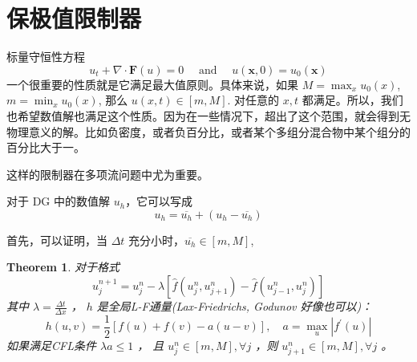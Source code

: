 \documentclass{article}
\newtheorem{theorem}{Theorem}
\numberwithin{equation}{subsection}    %
\begin{document}
\section{保极值限制器}
\cite{RN6}
标量守恒性方程
\begin{equation}
    u_{t}+\nabla \cdot \mathbf{F}(u)=0 \quad \text { and } \quad u(\mathbf{x}, 0)=u_{0}(\mathbf{x})
\end{equation}
一个很重要的性质就是它满足最大值原则。具体来说，如果 $M=\max_x u_0(x)$,$m=\min_x u_0(x)$, 那么 $u(x,t)\in[m,M]$. 对任意的 $x,t$ 都满足。所以，我们也希望数值解也满足这个性质。因为在一些情况下，超出了这个范围，就会得到无物理意义的解。比如负密度，或者负百分比，或者某个多组分混合物中某个组分的百分比大于一。

这样的限制器在多项流问题中尤为重要。

对于 DG 中的数值解 $u_h$，它可以写成
\begin{equation}
    u_{h}=\overline{u_h}+(u_h-\overline{u_h})
\end{equation}

首先，可以证明，当 $\Delta t$ 充分小时，$\overline{u_h}\in[m,M]$,

\begin{theorem}
    对于格式
    \begin{equation}
        u_j^{n+1} = u_j^n - \lambda\left[\hat{f}(u_j^n,u_{j+1}^n)-\hat{f}(u_{j-1}^n,u_j^n)\right]
    \end{equation}
    其中  $\lambda=\frac{\Delta t}{\Delta x}$ ， $h$  是全局L-F通量(Lax-Friedrichs, Godunov 好像也可以)：
    \begin{equation}
        h(u, v)=\frac{1}{2}[f(u)+f(v)-a(u-v)], \quad a=\max _{u}\left|f^{\prime}(u)\right|
    \end{equation}
    如果满足CFL条件  $\lambda a \leq 1$  ， 且  $u_{j}^{n} \in[m, M], \forall j$ ，则  $u_{j+1}^{n} \in[m, M], \forall j$  。
\end{theorem}
\end{document}
